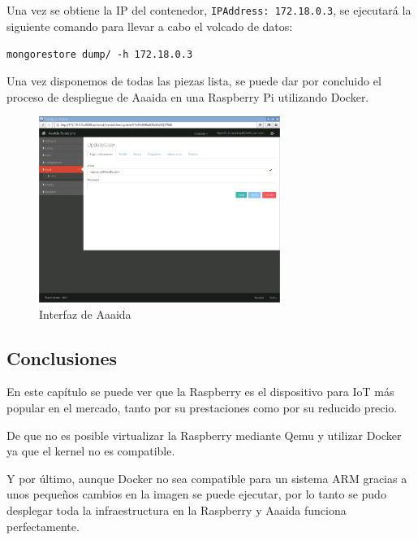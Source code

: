 Una vez se obtiene la IP del contenedor, \texttt{IPAddress: 172.18.0.3}, se ejecutará la siguiente comando para llevar a cabo el volcado de datos:

\begin{center}
\texttt{mongorestore dump/ -h 172.18.0.3}
\end{center}

Una vez disponemos de todas las piezas lista, se puede dar por concluido el proceso de despliegue de Aaaida en una Raspberry Pi utilizando Docker. 

\begin{figure}[htb]
\begin{center}
\includegraphics[width=0.70\textwidth]{./setup/aaaidaCoIoTe}
\caption{Interfaz de Aaaida}
\label{aidaCoI:aaaidaCoiote}
\end{center}
\end{figure} 
 
 \subsection{Conclusiones} 
 
En este capítulo se puede ver que la Raspberry es el dispositivo para IoT más popular en el mercado, tanto por su prestaciones como por su reducido precio.
 
De que no es posible virtualizar la Raspberry mediante Qemu y utilizar Docker ya que el kernel no es compatible. 

Y por último, aunque Docker no sea compatible para un sistema ARM gracias a unos pequeños cambios en la imagen se puede ejecutar, por lo tanto se pudo desplegar toda la infraestructura en la Raspberry y Aaaida funciona perfectamente. 
